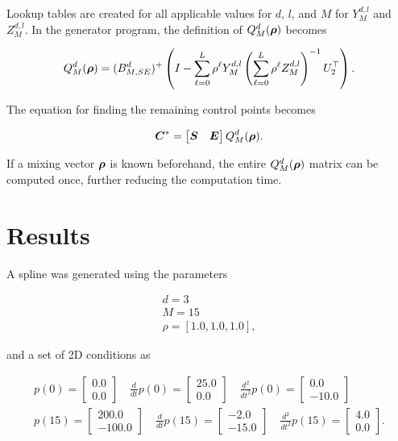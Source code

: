 Lookup tables are created for all applicable values for $d$, $l$, and $M$ for $Y^{d,l}_M$ and $Z^{d,l}_M$. 
In the generator program, the definition of $Q_M^{d}(\boldsymbol{\rho})$ becomes

\begin{align}
    Q_M^{d}(\boldsymbol{\rho}) = (B^d_{M,SE})^+ \left(I - \sum_{\ell=0}^L \rho^\ell Y^{d,l}_M \left(\sum_{\ell=0}^L \rho^\ell Z^{d,l}_M\right)^{-1} U_2^\top \right).
\end{align}

The equation for finding the remaining control points becomes

\begin{align}
    \boldsymbol{C}^\ast = 
    \begin{bmatrix} 
        \boldsymbol{S} & \boldsymbol{E} 
    \end{bmatrix}
    Q_M^{d}(\boldsymbol{\rho}).
\end{align}

If a mixing vector $\boldsymbol{\rho}$ is known beforehand, the entire $Q_M^{d}(\boldsymbol{\rho})$ matrix can be computed once, further reducing the computation time. 

\section{Results}

A spline was generated using the parameters

\begin{align}
    d = 3\\
    M = 15\\
    \rho = \left[1.0, 1.0, 1.0\right],
\end{align}

and a set of 2D conditions as

\begin{align}
    p(0) =
    \begin{bmatrix}
        0.0\\
        0.0
    \end{bmatrix}
    \quad
    \frac{d}{dt}p(0) =
    \begin{bmatrix}
        25.0\\
        0.0
    \end{bmatrix}
    \quad
    \frac{d^2}{dt^2}p(0) =
    \begin{bmatrix}
        0.0\\
        -10.0
    \end{bmatrix}\\
    p(15) =
    \begin{bmatrix}
        200.0\\
        -100.0
    \end{bmatrix}
    \quad
    \frac{d}{dt}p(15) =
    \begin{bmatrix}
        -2.0\\
        -15.0
    \end{bmatrix}
    \quad
    \frac{d^2}{dt^2}p(15) =
    \begin{bmatrix}
        4.0\\
        0.0
    \end{bmatrix}.
\end{align}

